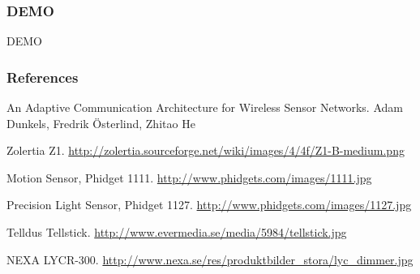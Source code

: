 \documentclass{beamer}
\begin{document}
\begin{frame}
\frametitle{DEMO}
	
	DEMO
	
\end{frame}

\begin{frame}
\frametitle{References}

\begin{thebibliography}{10} 

An Adaptive Communication Architecture for Wireless Sensor Networks.
\newblock Adam Dunkels, Fredrik Österlind, Zhitao He

Zolertia Z1.
\newblock \url{http://zolertia.sourceforge.net/wiki/images/4/4f/Z1-B-medium.png}

Motion Sensor, Phidget 1111.
\newblock \url{http://www.phidgets.com/images/1111.jpg}

Precision Light Sensor, Phidget 1127.
\newblock \url{http://www.phidgets.com/images/1127.jpg}

Telldus Tellstick.
\newblock \url{http://www.evermedia.se/media/5984/tellstick.jpg}

NEXA LYCR-300.
\newblock \url{http://www.nexa.se/res/produktbilder_stora/lyc_dimmer.jpg}

\end{thebibliography}

\end{frame}
\end{document}
